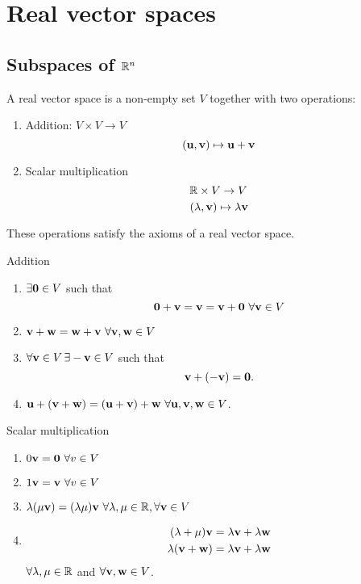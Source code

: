 \documentclass[10pt, a4paper]{article}
\begin{document}
\newpage

\section{Real vector spaces}
\subsection{Subspaces of \texorpdfstring{$\mathbb{R} ^ n$}{}}
\begin{definition}
    A real vector space is a non-empty set $V$ together with two operations:
    \begin{enumerate}[label = (\roman*)]
        \item Addition: $V \times V \rightarrow V$
        \[
        (\mathbf{u}, \mathbf{v}) \mapsto \mathbf{u} + \mathbf{v}
        \]
        \item Scalar multiplication
        \[
        \mathbb{R} \times V \rightarrow V
        \]
        \[
        (\lambda, \mathbf{v}) \mapsto \lambda\mathbf{v}
        \]
    \end{enumerate}
    These operations satisfy the axioms of a real vector space.
\end{definition}

Addition
\begin{enumerate}[label = (\roman*)]
    \item $\exists\mathbf{0} \in V$ such that
    \[
    \mathbf{0} + \mathbf{v} = \mathbf{v} = \mathbf{v} + \mathbf{0}\ \forall\mathbf{v} \in V
    \]
    \item $\mathbf{v + w = w + v}\ \forall \mathbf{v, w} \in V$
    \item $\forall\mathbf{v} \in V\, \exists -\mathbf{v} \in V$ such that
    \[
    \mathbf{v} + (-\mathbf{v}) = \mathbf{0}.
    \]
    \item $\mbf{u + (v + w) = (u + v) + w}\ \forall \mbf{u, v, w} \in V$.
\end{enumerate}

Scalar multiplication
\begin{enumerate}[label = (\roman*)]
    \item $0\mathbf{v} = \mathbf{0}\ \forall v \in V$
    \item $1\mathbf{v} = \mathbf{v}\ \forall v \in V$
    \item $\lambda(\mu\mathbf{v}) = (\lambda\mu)\mathbf{v}\ \forall \lambda, \mu \in \mathbb{R}, \forall \mathbf{v} \in V$
    \item
    \begin{align*}
        (\lambda + \mu)\mathbf{v} &= \lambda\mathbf{v} + \lambda\mathbf{w} \\
        \lambda(\mathbf{v} + \mathbf{w}) &= \lambda\mathbf{v} + \lambda\mathbf{w}
    \end{align*}
    $\forall \lambda, \mu \in \mathbb{R}$ and $\forall \mathbf{v, w} \in V$.
\end{enumerate}
\end{document}

